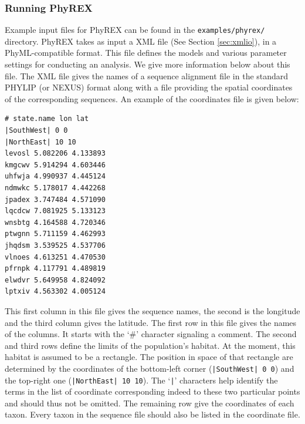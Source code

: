 \documentclass[a4paper,12pt]{article}
\newcommand{\x}[1]{\texttt{#1}}
\begin{document}
\subsubsection{Running PhyREX}

Example input files for PhyREX can be found in the \x{examples/phyrex/} directory.
PhyREX takes as input a XML file (See Section \ref{sec:xmlio}), in a PhyML-compatible format. This
file defines the models and various parameter settings for conducting an analysis. We give more
information below about this file. The XML file gives the names of a sequence alignment file in the
standard PHYLIP (or NEXUS) format along with a file providing the spatial coordinates of the
corresponding sequences.  An example of the coordinates file is given
below:
\begin{Verbatim}[frame=single, label=Valid PhyREX spatial location file, samepage=true, baselinestretch=0.5]
# state.name lon lat
|SouthWest| 0 0
|NorthEast| 10 10 
levosl 5.082206 4.133893 
kmgcwv 5.914294 4.603446 
uhfwja 4.990937 4.445124 
ndmwkc 5.178017 4.442268 
jpadex 3.747484 4.571090 
lqcdcw 7.081925 5.133123 
wnsbtg 4.164588 4.720346 
ptwgnn 5.711159 4.462993 
jhqdsm 3.539525 4.537706 
vlnoes 4.613251 4.470530 
pfrnpk 4.117791 4.489819 
elwdvr 5.649958 4.824092 
lptxiv 4.563302 4.005124 
\end{Verbatim}
This first column in this  file gives the sequence names, the second is  the longitude and the third
column gives the latitude. The first row in this file gives the names of the columns. It starts with
the  `\#' character  signaling  a comment.  The  second and  third  rows define  the  limits of  the
population's habitat.  At the moment,  this habitat is  assumed to be  a rectangle. The  position in
space of that rectangle are determined by  the coordinates of the bottom-left corner (\x{|SouthWest|
0 0}) and the top-right one (\x{|NorthEast| 10  10}). The `\x{|}' characters help identify the terms
in the list of coordinate corresponding indeed to these two particular points and should thus not be
omitted. The  remaining row give  the coordinates of  each taxon. Every  taxon in the  sequence file
should also be listed in the coordinate file.
\end{document}
